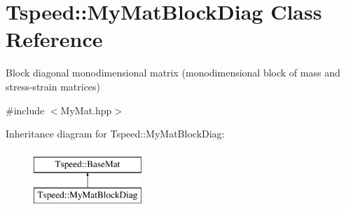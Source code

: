 \hypertarget{classTspeed_1_1MyMatBlockDiag}{\section{Tspeed\-:\-:My\-Mat\-Block\-Diag Class Reference}
\label{classTspeed_1_1MyMatBlockDiag}
}


Block diagonal monodimensional matrix (monodimensional block of mass and stress-\/strain matrices)  




{\ttfamily \#include $<$My\-Mat.\-hpp$>$}

Inheritance diagram for Tspeed\-:\-:My\-Mat\-Block\-Diag\-:\begin{figure}[H]
\begin{center}
\leavevmode
\includegraphics[height=2.000000cm]{classTspeed_1_1MyMatBlockDiag}
\end{center}
\end{figure}
